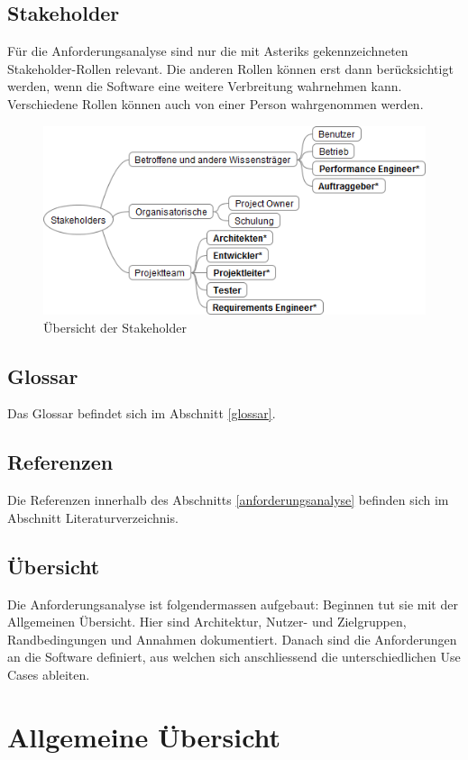 \subsection{Stakeholder}
Für die Anforderungsanalyse sind nur die mit Asteriks gekennzeichneten Stakeholder-Rollen relevant. Die anderen Rollen können erst dann berücksichtigt werden, wenn die Software eine weitere Verbreitung wahrnehmen kann. Verschiedene Rollen können auch von einer Person wahrgenommen werden. 
\begin{figure}[H]
  	\centering
    	\includegraphics[width=13cm]{images/stakeholder_analyse}
        	\caption{Übersicht der Stakeholder}
\end{figure}

\subsection{Glossar}
Das Glossar befindet sich im Abschnitt \ref{glossar}. 
\subsection{Referenzen}
Die Referenzen innerhalb des Abschnitts \ref{anforderungsanalyse} befinden sich im Abschnitt Literaturverzeichnis.
\subsection{Übersicht}
Die Anforderungsanalyse ist folgendermassen aufgebaut: Beginnen tut sie mit der Allgemeinen Übersicht. Hier sind Architektur, Nutzer- und Zielgruppen, Randbedingungen und Annahmen dokumentiert. Danach sind die Anforderungen an die Software definiert, aus welchen sich anschliessend die unterschiedlichen Use Cases ableiten.
\section{Allgemeine Übersicht}\label{allgemeine_uebersicht}
